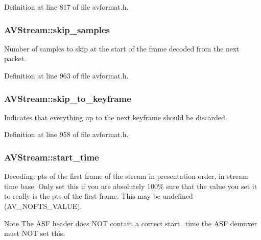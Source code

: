 Definition at line 817 of file avformat.\+h.

\subsubsection[{\texorpdfstring{skip\+\_\+samples}{skip_samples}}]{ A\+V\+Stream\+::skip\+\_\+samples}\hypertarget{struct_a_v_stream_a50093ce4f0989bfbcac3d04fedc2093a}{}\label{struct_a_v_stream_a50093ce4f0989bfbcac3d04fedc2093a}
Number of samples to skip at the start of the frame decoded from the next packet. 

Definition at line 963 of file avformat.\+h.

\subsubsection[{\texorpdfstring{skip\+\_\+to\+\_\+keyframe}{skip_to_keyframe}}]{ A\+V\+Stream\+::skip\+\_\+to\+\_\+keyframe}\hypertarget{struct_a_v_stream_a097cabf56050028604b398d097c2a5a5}{}\label{struct_a_v_stream_a097cabf56050028604b398d097c2a5a5}
Indicates that everything up to the next keyframe should be discarded. 

Definition at line 958 of file avformat.\+h.

\subsubsection[{\texorpdfstring{start\+\_\+time}{start_time}}]{ A\+V\+Stream\+::start\+\_\+time}\hypertarget{struct_a_v_stream_a7c67ae70632c91df8b0f721658ec5377}{}\label{struct_a_v_stream_a7c67ae70632c91df8b0f721658ec5377}
Decoding\+: pts of the first frame of the stream in presentation order, in stream time base. Only set this if you are absolutely 100\% sure that the value you set it to really is the pts of the first frame. This may be undefined (A\+V\+\_\+\+N\+O\+P\+T\+S\+\_\+\+V\+A\+L\+UE). \begin{DoxyNote}{Note}
The A\+SF header does N\+OT contain a correct start\+\_\+time the A\+SF demuxer must N\+OT set this. 
\end{DoxyNote}


